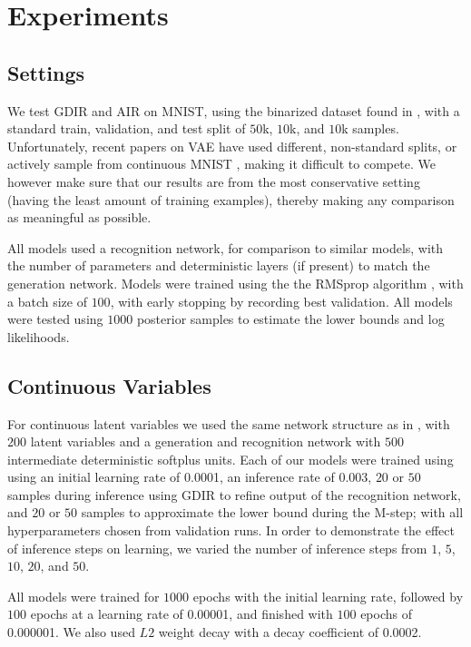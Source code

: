 \documentclass{article} %
\begin{document}
\section{Experiments}

\subsection{Settings}

We test GDIR and AIR on MNIST, using the binarized dataset found in \citep{salakhutdinov2008quantitative}, with a standard train, validation, and test split of $50$k, $10$k, and $10$k samples. Unfortunately, recent papers on VAE \citep{mnih2014neural, salimans2014markov} have used different, non-standard splits, or actively sample from continuous MNIST \citep{burda2015importance}, making it difficult to compete. We however make sure that our results are from the most conservative setting (having the least amount of training examples), thereby making any comparison as meaningful as possible.

All models used a recognition network, for comparison to similar models, with the number of parameters and deterministic layers (if present) to match the generation network. Models were trained using the the RMSprop algorithm \citep{Hinton-Coursera2012}, with a batch size of $100$, with early stopping by recording best validation. All models were tested using $1000$ posterior samples to estimate the lower bounds and log likelihoods.

\subsection{Continuous Variables}
For continuous latent variables we used the same network structure as in \citep{kingma2013auto, salimans2014markov}, with $200$ latent variables and a generation and recognition network with $500$ intermediate deterministic softplus units. Each of our models were trained using using an initial learning rate of \num{0.0001}, an inference rate of \num{0.003}, $20$ or $50$ samples during inference using GDIR to refine output of the recognition network, and $20$ or $50$ samples to approximate the lower bound during the M-step; with all hyperparameters chosen from validation runs. In order to demonstrate the effect of inference steps on learning, we varied the number of inference steps from $1$, $5$, $10$, $20$, and $50$.

All models were trained for $1000$ epochs with the initial learning rate, followed by $100$ epochs at a learning rate of \num{0.00001}, and finished with $100$ epochs of \num{0.000001}. We also used $L2$ weight decay with a decay coefficient of \num{0.0002}.
\end{document}
